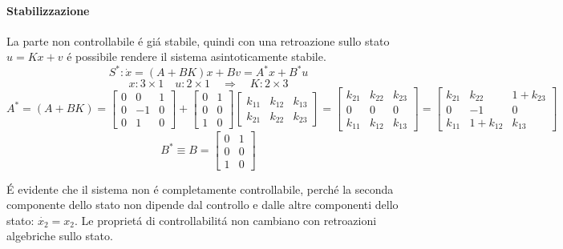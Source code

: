 \begin{Exercise}[title={Studio completo del sistema e stabilizzazione}, difficulty=3]
		\paragraph{Stabilizzazione}
			La parte non controllabile \'e gi\'a stabile, quindi con una retroazione sullo stato $ u = Kx + v $ \'e possibile rendere il sistema asintoticamente stabile.
			\[ S^{*}: \dot x = (A+BK)x + Bv = A^{*}x + B^{*}u \]
			\[ x: 3 \times 1 \quad u: 2 \times 1 \quad\Rightarrow\quad K: 2 \times 3 \]
			\[
				A^{*} = (A+BK) =
				\begin{bmatrix}
					0 & 0 & 1\\
					0 & -1 & 0\\
					0 & 1 & 0
				\end{bmatrix} +
				\begin{bmatrix}
					0 & 1\\
					0 & 0\\
					1 & 0
				\end{bmatrix}
				\begin{bmatrix}
					k_{11} & k_{12} & k_{13}\\
					k_{21} & k_{22} & k_{23}
				\end{bmatrix} =
				\begin{bmatrix}
					k_{21} & k_{22} & k_{23}\\
					0 & 0 & 0\\
					k_{11} & k_{12} & k_{13}
				\end{bmatrix} =
				\begin{bmatrix}
					k_{21} & k_{22} & 1 + k_{23}\\
					0 & -1 & 0\\
					k_{11} & 1 + k_{12} & k_{13}
				\end{bmatrix}
			\]
			\[
				B^{*} \equiv B =
				\begin{bmatrix}
					0 & 1\\
					0 & 0\\
					1 & 0
				\end{bmatrix}
			\]
			
			\'E evidente che il sistema non \'e completamente controllabile, perch\'e la seconda componente dello stato non dipende dal controllo e dalle altre componenti dello stato: $ \dot{x_2} = x_2 $. Le propriet\'a di controllabilit\'a non cambiano con retroazioni algebriche sullo stato.
			

\end{Exercise}
